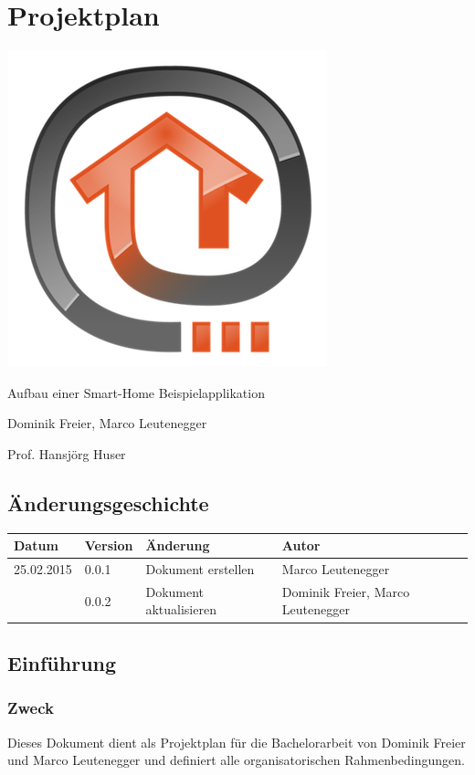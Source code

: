 \chapter{Projektplan}

\includegraphics{appendix/img/openhabLogo}

\begin{description}[style=multiline,leftmargin=3cm]
\item[Thema] Aufbau einer Smart-Home Beispielapplikation
\item[Studenten] Dominik Freier, Marco Leutenegger
\item[Betreuer] Prof. Hansjörg Huser
\end{description}
\pagebreak

\section*{Änderungsgeschichte}
	\begin{tabularx}{\textwidth}{lllX}
	\textbf{Datum}		& \textbf{Version}	& \textbf{Änderung}	& \textbf{Autor} \\
	\hline
	25.02.2015			& 0.0.1				& Dokument erstellen & Marco Leutenegger \\
	\hline
	\tbd					& 0.0.2				& Dokument aktualisieren	& Dominik Freier, Marco Leutenegger \\
	\hline
	\end{tabularx}
\pagebreak

\section*{Einführung}
\subsection*{Zweck}
Dieses Dokument dient als Projektplan für die Bachelorarbeit von Dominik Freier und Marco Leutenegger und definiert alle organisatorischen Rahmenbedingungen.

